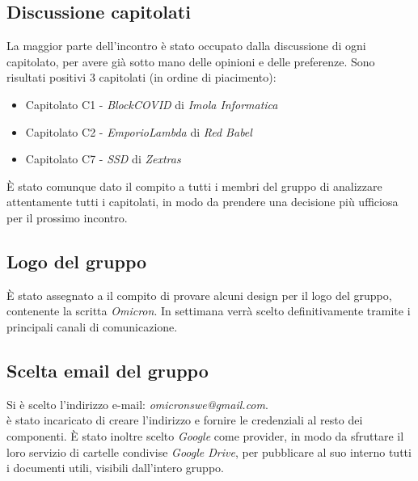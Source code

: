 \documentclass[12pt]{article}
\begin{document}
	\subsection{Discussione capitolati}
	La maggior parte dell'incontro è stato occupato dalla discussione di ogni capitolato, per avere già sotto mano delle opinioni e delle preferenze. Sono risultati positivi 3 capitolati (in ordine di piacimento):
	\begin{itemize}
		\item Capitolato C1 - \textit{BlockCOVID} di \textit{Imola Informatica}
		\item Capitolato C2 - \textit{EmporioLambda} di \textit{Red Babel}
		\item Capitolato C7 - \textit{SSD} di \textit{Zextras}
	\end{itemize}
	È stato comunque dato il compito a tutti i membri del gruppo di analizzare attentamente tutti i capitolati, in modo da prendere una decisione più ufficiosa per il prossimo incontro.
	
	\subsection{Logo del gruppo}
	È stato assegnato a \NM{} il compito di provare alcuni design per il logo del gruppo, contenente la scritta \textit{Omicron}. In settimana verrà scelto definitivamente tramite i principali canali di comunicazione.
	
	\subsection{Scelta email del gruppo}
	Si è scelto l'indirizzo e-mail: \textit{omicronswe@gmail.com}.\\
	\MDI{} è stato incaricato di creare l'indirizzo e fornire le credenziali al resto dei componenti. È stato inoltre scelto \textit{Google} come provider, in modo da sfruttare il loro servizio di cartelle condivise \textit{Google Drive}, per pubblicare al suo interno tutti i documenti utili, visibili dall'intero gruppo.
	
\end{document}
